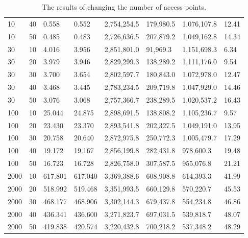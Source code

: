 {\begin{landscape}
\begin{table}
\begin{tabularx}{\linewidth}{|X|X|X|X|X|X|X|X|}
                        10 & 40 & 0.558 & 0.552 & 2,754,254.5 & 179,980.5 & 1,076,107.8 & 12.41 \\
                        10 & 50 & 0.485 & 0.483 & 2,726,636.5 & 207,879.2 & 1,049,162.8 & 14.34 \\
                        30 & 10 & 4.016 & 3.956 & 2,851,801.0 & 91,969.3 & 1,151,698.3 & 6.34 \\
                        30 & 20 & 3.979 & 3.946 & 2,829,299.3 & 138,289.2 & 1,111,176.0 & 9.54 \\
                        30 & 30 & 3.700 & 3.654 & 2,802,597.7 & 180,843.0 & 1,072,978.0 & 12.47 \\
                        30 & 40 & 3.468 & 3.445 & 2,783,234.5 & 209,719.8 & 1,047,929.0 & 14.46 \\
                        30 & 50 & 3.076 & 3.068 & 2,757,366.7 & 238,289.5 & 1,020,537.2 & 16.43 \\
                        100 & 10 & 25.044 & 24.875 & 2,898,691.5 & 138,808.2 & 1,105,236.7 & 9.57 \\
                        100 & 20 & 23.430 & 23.370 & 2,893,541.8 & 202,327.5 & 1,049,191.0 & 13.95 \\
                        100 & 30 & 20.758 & 20.640 & 2,872,975.8 & 250,772.3 & 1,005,479.7 & 17.29 \\
                        100 & 40 & 19.172 & 19.167 & 2,856,199.8 & 282,431.8 & 978,600.3 & 19.48 \\
                        100 & 50 & 16.723 & 16.728 & 2,826,758.0 & 307,587.5 & 955,076.8 & 21.21 \\
                        2000 & 10 & 617.801 & 617.040 & 3,369,388.6 & 608,908.8 & 614,393.3 & 41.99 \\
                        2000 & 20 & 518.992 & 519.468 & 3,351,993.5 & 660,129.8 & 570,220.7 & 45.53 \\
                        2000 & 30 & 468.177 & 468.906 & 3,302,144.3 & 679,437.8 & 554,234.8 & 46.86 \\
                        2000 & 40 & 436.341 & 436.600 & 3,271,823.7 & 697,031.5 & 539,818.7 & 48.07 \\
                        2000 & 50 & 419.838 & 420.574 & 3,220,432.8 & 700,218.2 & 537,348.2 & 48.29 \\
                        \hline
                    \end{tabularx}
                    \caption{The results of changing the number of access points.}
                    \label{tab:num_aps}
                \end{table}
            \end{landscape}
        }

